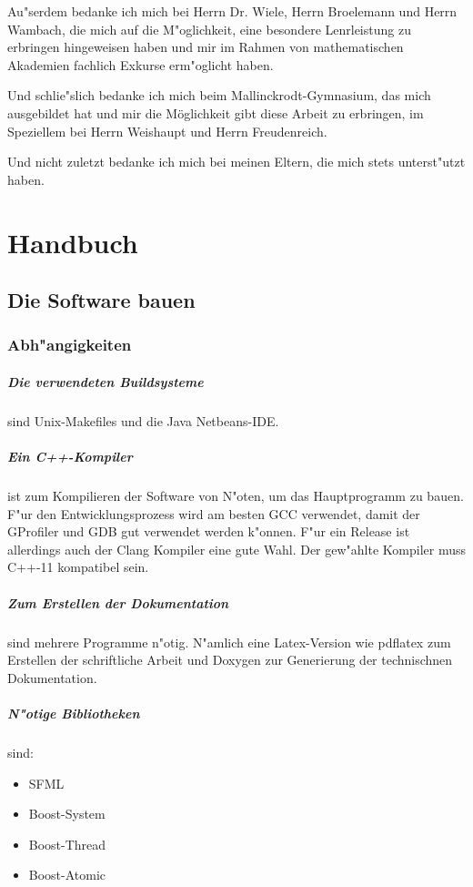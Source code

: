 \documentclass[14pt, a4paper]{report}
\begin{document}
Au"serdem bedanke ich mich bei Herrn Dr. Wiele, Herrn Broelemann und Herrn Wambach, 
die mich auf die M"oglichkeit, eine besondere Lenrleistung zu erbringen hingeweisen 
haben und mir im
Rahmen von mathematischen Akademien fachlich Exkurse erm"oglicht haben. 

Und schlie"slich bedanke ich mich beim Mallinckrodt-Gymnasium, das mich ausgebildet hat und mir die Möglichkeit
gibt diese Arbeit zu erbringen, im Speziellem bei Herrn Weishaupt und Herrn
Freudenreich. 

Und nicht zuletzt bedanke ich mich bei meinen Eltern, die mich stets unterst"utzt haben.
 


\appendix
\chapter{Handbuch}
\section{Die Software bauen}

\subsection{Abh"angigkeiten}
\paragraph{Die verwendeten Buildsysteme} sind Unix-Makefiles und die Java Netbeans-IDE.  
\paragraph{Ein C++-Kompiler} ist zum Kompilieren der Software von N"oten, um das 
Hauptprogramm zu bauen. F"ur den Entwicklungsprozess wird am besten GCC verwendet, damit
der GProfiler und GDB gut verwendet werden k"onnen. F"ur ein Release ist allerdings auch
der Clang Kompiler eine gute Wahl. Der gew"ahlte Kompiler muss C++-11 kompatibel sein.

\paragraph{Zum Erstellen der Dokumentation} sind mehrere Programme n"otig. N"amlich
eine Latex-Version wie pdflatex zum Erstellen der schriftliche Arbeit und Doxygen zur
Generierung der technischnen Dokumentation.
\paragraph{N"otige Bibliotheken} sind:
\begin{itemize}
\item SFML
\item Boost-System
\item Boost-Thread
\item Boost-Atomic
\end{itemize}
\end{document}
